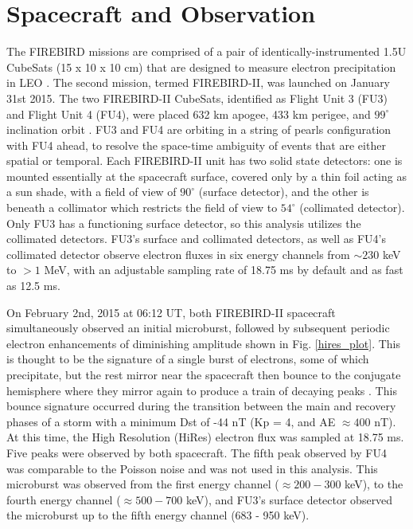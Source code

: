 \documentclass[draft, linenumbers]{agujournal}
\begin{document}
\section{Spacecraft and Observation} \label{obs} %
The FIREBIRD missions are comprised of a pair of identically-instrumented 1.5U CubeSats (15 x 10 x 10 cm) that are designed to measure electron precipitation in LEO \citep{Spence2012, Klumpar2015}. The second mission, termed FIREBIRD-II, was launched on January 31st 2015.  The two FIREBIRD-II CubeSats, identified as Flight Unit 3 (FU3) and Flight Unit 4 (FU4), were placed 632 km apogee, 433 km perigee, and $99^{\circ}$ inclination orbit \citep{Crew2016}. FU3 and FU4 are orbiting in a string of pearls configuration with FU4 ahead, to resolve the space-time ambiguity of events that are either spatial or temporal. Each FIREBIRD-II unit has two solid state detectors: one is mounted essentially at the spacecraft surface, covered only by a thin foil acting as a sun shade, with a field of view of $90^{\circ}$ (surface detector), and the other is beneath a collimator which restricts the field of view to $54^{\circ}$ (collimated detector). Only FU3 has a functioning surface detector, so this analysis utilizes the collimated detectors. FU3's surface and collimated detectors, as well as FU4's collimated detector observe electron fluxes in six energy channels from $\sim 230$ keV to $> 1$ MeV, with an adjustable sampling rate of 18.75 ms by default and as fast as 12.5 ms. 

On February 2nd, 2015 at 06:12 UT, both FIREBIRD-II spacecraft simultaneously observed an initial microburst, followed by subsequent periodic electron enhancements of diminishing amplitude shown in Fig. \ref{hires_plot}. This is thought to be the signature of a single burst of electrons, some of which precipitate, but the rest mirror near the spacecraft then bounce to the conjugate hemisphere where they mirror again to produce a train of decaying peaks \citep{Blake1996, Thorne2005}. This bounce signature occurred during the transition between the main and recovery phases of a storm with a minimum Dst of -44 nT (Kp = 4, and AE ${\approx 400}$ nT). At this time, the High Resolution (HiRes) electron flux was sampled at 18.75 ms. Five peaks were observed by both spacecraft. The fifth peak observed by FU4 was comparable to the Poisson noise and was not used in this analysis. This microburst was observed from the first energy channel ($\approx 200-300$ keV), to the fourth energy channel ($\approx 500-700$ keV), and FU3's surface detector observed the microburst up to the fifth energy channel (683 - 950 keV). 
\end{document}
